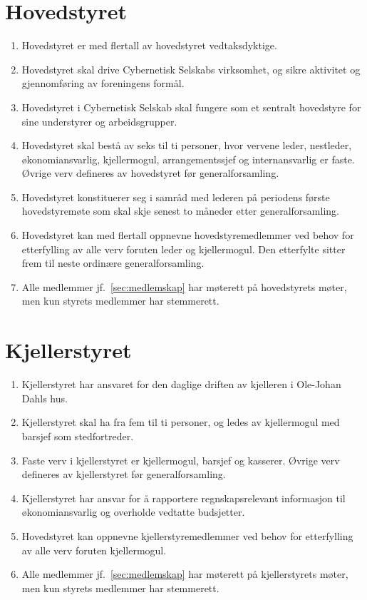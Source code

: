 \documentclass[8pt,norsk,a4paper]{article}
\begin{document}
\section{Hovedstyret}
\begin{enumerate}
	\item{Hovedstyret er med  flertall av hovedstyret vedtaksdyktige.}
	\item{Hovedstyret skal drive Cybernetisk Selskabs virksomhet, og sikre aktivitet og gjennomføring av foreningens formål.}
	\item{Hovedstyret i Cybernetisk Selskab skal fungere som et sentralt hovedstyre for sine understyrer og arbeidsgrupper.}
	\item{Hovedstyret skal bestå av seks til ti personer, hvor vervene leder, nestleder, økonomiansvarlig, kjellermogul, arrangementssjef og internansvarlig er faste. Øvrige verv defineres av hovedstyret før generalforsamling.\label{sec:hs-antall}}
	\item{Hovedstyret konstituerer seg i samråd med lederen på periodens første hovedstyremøte som skal skje senest to måneder etter generalforsamling.}
	\item{Hovedstyret kan med  flertall oppnevne hovedstyremedlemmer ved behov for etterfylling av alle verv foruten leder og kjellermogul. Den etterfylte sitter frem til neste ordinære generalforsamling.} 
	\item{Alle medlemmer jf.~\ref{sec:medlemskap} har møterett på hovedstyrets møter, men kun styrets medlemmer har stemmerett.}
\end{enumerate}

\section{Kjellerstyret}
\begin{enumerate}
	\item{Kjellerstyret har ansvaret for den daglige driften av kjelleren i Ole-Johan Dahls hus.}
	\item{Kjellerstyret skal ha fra fem til ti personer, og ledes av kjellermogul med barsjef som stedfortreder.}
	\item{Faste verv i kjellerstyret er kjellermogul, barsjef og kasserer. Øvrige verv defineres av kjellerstyret før generalforsamling.}
	\item{Kjellerstyret har ansvar for å rapportere regnskapsrelevant informasjon til økonomiansvarlig og overholde vedtatte budsjetter.}
	\item{Hovedstyret kan oppnevne kjellerstyremedlemmer ved behov for etterfylling av alle verv foruten kjellermogul.}
 	\item{Alle medlemmer jf.~\ref{sec:medlemskap} har møterett på kjellerstyrets møter, men kun styrets medlemmer har stemmerett.}
\end{enumerate}
\end{document}

